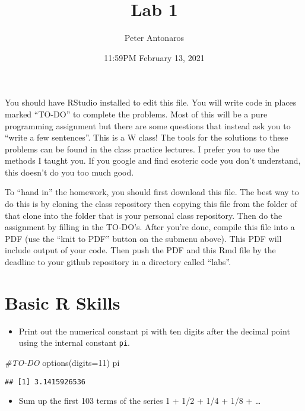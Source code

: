 \documentclass[
]{article}
\title{Lab 1}
\author{Peter Antonaros}
\date{11:59PM February 13, 2021}
\newenvironment{Shaded}{\begin{snugshade}}{\end{snugshade}}
\newcommand{\AttributeTok}[1]{\textcolor[rgb]{0.77,0.63,0.00}{#1}}
\newcommand{\CommentTok}[1]{\textcolor[rgb]{0.56,0.35,0.01}{\textit{#1}}}
\newcommand{\DecValTok}[1]{\textcolor[rgb]{0.00,0.00,0.81}{#1}}
\newcommand{\FunctionTok}[1]{\textcolor[rgb]{0.00,0.00,0.00}{#1}}
\newcommand{\NormalTok}[1]{#1}
\providecommand{\tightlist}{%
  \setlength{\itemsep}{0pt}\setlength{\parskip}{0pt}}
\begin{document}
\maketitle

You should have RStudio installed to edit this file. You will write code
in places marked ``TO-DO'' to complete the problems. Most of this will
be a pure programming assignment but there are some questions that
instead ask you to ``write a few sentences''. This is a W class! The
tools for the solutions to these problems can be found in the class
practice lectures. I prefer you to use the methods I taught you. If you
google and find esoteric code you don't understand, this doesn't do you
too much good.

To ``hand in'' the homework, you should first download this file. The
best way to do this is by cloning the class repository then copying this
file from the folder of that clone into the folder that is your personal
class repository. Then do the assignment by filling in the TO-DO's.
After you're done, compile this file into a PDF (use the ``knit to PDF''
button on the submenu above). This PDF will include output of your code.
Then push the PDF and this Rmd file by the deadline to your github
repository in a directory called ``labs''.

\hypertarget{basic-r-skills}{%
\section{Basic R Skills}\label{basic-r-skills}}

\begin{itemize}
\tightlist
\item
  Print out the numerical constant pi with ten digits after the decimal
  point using the internal constant \texttt{pi}.
\end{itemize}

\begin{Shaded}
\begin{Highlighting}[]
\CommentTok{\#TO{-}DO\textquotesingle{}}
\FunctionTok{options}\NormalTok{(}\AttributeTok{digits=}\DecValTok{11}\NormalTok{)}
\NormalTok{pi}
\end{Highlighting}
\end{Shaded}

\begin{verbatim}
## [1] 3.1415926536
\end{verbatim}

\begin{itemize}
\tightlist
\item
  Sum up the first 103 terms of the series 1 + 1/2 + 1/4 + 1/8 +
  \ldots{}
\end{itemize}
\end{document}
